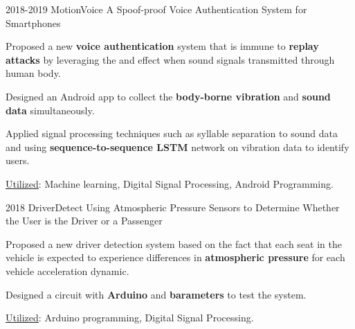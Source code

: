 \begin{cventries}

	
	\cvprojectentry
	{2018-2019 MotionVoice}
	{A Spoof-proof Voice Authentication System for Smartphones}
	{
		\begin{cvitems} %
			\item Proposed a new \textbf{voice authentication} system that is immune to \textbf{replay attacks} by leveraging the  and  effect when sound signals transmitted through human body.
			\item Designed an Android app to collect the \textbf{body-borne vibration} and \textbf{sound data} simultaneously.
			\item Applied signal processing techniques such as syllable separation to sound data and using \textbf{sequence-to-sequence LSTM} network on vibration data to identify users.
			\item  \underline{Utilized}: {Machine learning, Digital Signal Processing, Android Programming.}
		\end{cvitems}
	}
	
	
	\cvprojectentry
	{2018 DriverDetect}
	{Using Atmospheric Pressure Sensors to Determine Whether the User is the Driver or a Passenger}
	{
		\begin{cvitems} %
			\item Proposed a new driver detection system based on the fact that each seat in the vehicle is expected to experience differences in \textbf{atmospheric pressure} for each vehicle acceleration dynamic. 
			\item Designed a circuit with \textbf{Arduino} and \textbf{barameters} to test the system. 
			\item \underline{Utilized}: {Arduino programming, Digital Signal Processing.}
		\end{cvitems}
	}
	
	
	
	

\end{cventries}
